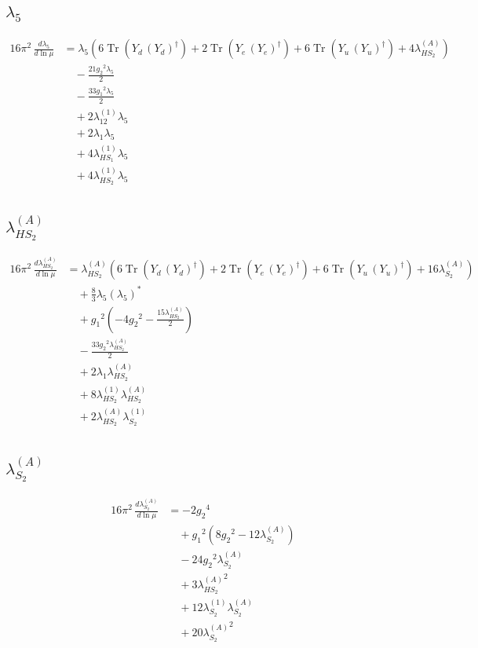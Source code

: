 \documentclass[10pt,a4paper]{article}
\begin{document}
\subsection*{$\lambda_5$}
\begin{align*}
16\pi^2\,\frac{d \lambda_5}{d\ln\mu} &={\lambda_5} (6 \operatorname{Tr}\!\left({Y_d}\,\left({Y_d}\right)^{\dagger}\right)+2 \operatorname{Tr}\!\left({Y_e}\,\left({Y_e}\right)^{\dagger}\right)+6 \operatorname{Tr}\!\left({Y_u}\,\left({Y_u}\right)^{\dagger}\right)+4 {\lambda_{HS_2}^{(A)}}) \\
&\quad -\frac{21 {g_2}^2 {\lambda_5}}{2} \\
&\quad -\frac{33 {g_1}^2 {\lambda_5}}{2} \\
&\quad +2 {\lambda_{12}^{(1)}} {\lambda_5} \\
&\quad +2 {\lambda_1} {\lambda_5} \\
&\quad +4 {\lambda_{HS_1}^{(1)}} {\lambda_5} \\
&\quad +4 {\lambda_{HS_2}^{(1)}} {\lambda_5} \\
\end{align*}
\subsection*{$\lambda_{HS_2}^{(A)}$}
\begin{align*}
16\pi^2\,\frac{d \lambda_{HS_2}^{(A)}}{d\ln\mu} &={\lambda_{HS_2}^{(A)}} (6 \operatorname{Tr}\!\left({Y_d}\,\left({Y_d}\right)^{\dagger}\right)+2 \operatorname{Tr}\!\left({Y_e}\,\left({Y_e}\right)^{\dagger}\right)+6 \operatorname{Tr}\!\left({Y_u}\,\left({Y_u}\right)^{\dagger}\right)+16 {\lambda_{S_2}^{(A)}}) \\
&\quad +\frac{8}{3} {\lambda_5} \left({\lambda_5}\right)^{*} \\
&\quad +{g_1}^2 \left(-4 {g_2}^2-\frac{15 {\lambda_{HS_2}^{(A)}}}{2}\right) \\
&\quad -\frac{33 {g_2}^2 {\lambda_{HS_2}^{(A)}}}{2} \\
&\quad +2 {\lambda_1} {\lambda_{HS_2}^{(A)}} \\
&\quad +8 {\lambda_{HS_2}^{(1)}} {\lambda_{HS_2}^{(A)}} \\
&\quad +2 {\lambda_{HS_2}^{(A)}} {\lambda_{S_2}^{(1)}} \\
\end{align*}
\subsection*{$\lambda_{S_2}^{(A)}$}
\begin{align*}
16\pi^2\,\frac{d \lambda_{S_2}^{(A)}}{d\ln\mu} &=-2 {g_2}^4 \\
&\quad +{g_1}^2 \left(8 {g_2}^2-12 {\lambda_{S_2}^{(A)}}\right) \\
&\quad -24 {g_2}^2 {\lambda_{S_2}^{(A)}} \\
&\quad +3 {\lambda_{HS_2}^{(A)}}^2 \\
&\quad +12 {\lambda_{S_2}^{(1)}} {\lambda_{S_2}^{(A)}} \\
&\quad +20 {\lambda_{S_2}^{(A)}}^2 \\
\end{align*}
\end{document}
